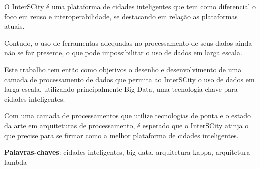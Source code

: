 \begin{resumo}

O InterSCity é uma plataforma de cidades inteligentes que tem como
    diferencial o foco em reuso e interoperabilidade, se destacando em
    relação as plataformas atuais.

Contudo, o uso de ferramentas adequadas no processamento de seus dados ainda
    não se faz presente, o que pode impossibilitar o uso de dados em larga escala.

Este trabalho tem então como objetivos o desenho e desenvolvimento de uma
    camada de processamento de dados que permita ao InterSCity o uso de dados em
    larga escala, utilizando principalmente Big Data, uma tecnologia chave para
    cidades inteligentes.

Com uma camada de processamentos que utilize tecnologias de ponta e o estado
    da arte em arquiteturas de processamento, é esperado que o InterSCity
    atinja o que precise para se firmar como a melhor plataforma de cidades
    inteligentes.

 \vspace{\onelineskip}
    
 \noindent
 \textbf{Palavras-chaves}: cidades inteligentes, big data, arquitetura kappa, arquitetura lambda
\end{resumo}
